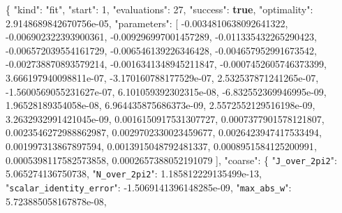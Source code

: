 \documentclass[
  10pt,
]{article}
\newenvironment{Shaded}{}{}
\newcommand{\DataTypeTok}[1]{\textcolor[rgb]{0.56,0.13,0.00}{#1}}
\newcommand{\DecValTok}[1]{\textcolor[rgb]{0.25,0.63,0.44}{#1}}
\newcommand{\FloatTok}[1]{\textcolor[rgb]{0.25,0.63,0.44}{#1}}
\newcommand{\FunctionTok}[1]{\textcolor[rgb]{0.02,0.16,0.49}{#1}}
\newcommand{\KeywordTok}[1]{\textcolor[rgb]{0.00,0.44,0.13}{\textbf{#1}}}
\newcommand{\OtherTok}[1]{\textcolor[rgb]{0.00,0.44,0.13}{#1}}
\newcommand{\StringTok}[1]{\textcolor[rgb]{0.25,0.44,0.63}{#1}}
\begin{document}
\begin{Shaded}
\begin{Highlighting}[]
\FunctionTok{\{}
  \DataTypeTok{"kind"}\FunctionTok{:} \StringTok{"fit"}\FunctionTok{,}
  \DataTypeTok{"start"}\FunctionTok{:} \DecValTok{1}\FunctionTok{,}
  \DataTypeTok{"evaluations"}\FunctionTok{:} \DecValTok{27}\FunctionTok{,}
  \DataTypeTok{"success"}\FunctionTok{:} \KeywordTok{true}\FunctionTok{,}
  \DataTypeTok{"optimality"}\FunctionTok{:} \FloatTok{2.9148689842670756e{-}05}\FunctionTok{,}
  \DataTypeTok{"parameters"}\FunctionTok{:} \OtherTok{[}
    \FloatTok{{-}0.0034810638092641322}\OtherTok{,}
    \FloatTok{{-}0.006902322393900361}\OtherTok{,}
    \FloatTok{{-}0.009296997001457289}\OtherTok{,}
    \FloatTok{{-}0.011335432265290423}\OtherTok{,}
    \FloatTok{{-}0.006572039554161729}\OtherTok{,}
    \FloatTok{{-}0.006546139226346428}\OtherTok{,}
    \FloatTok{{-}0.004657952991673542}\OtherTok{,}
    \FloatTok{{-}0.002738870893579214}\OtherTok{,}
    \FloatTok{{-}0.0016341348945211847}\OtherTok{,}
    \FloatTok{{-}0.0007452605746373399}\OtherTok{,}
    \FloatTok{3.666197940098811e{-}07}\OtherTok{,}
    \FloatTok{{-}3.170160788177529e{-}07}\OtherTok{,}
    \FloatTok{2.532537871241265e{-}07}\OtherTok{,}
    \FloatTok{{-}1.5600569055231627e{-}07}\OtherTok{,}
    \FloatTok{6.101059392302315e{-}08}\OtherTok{,}
    \FloatTok{{-}6.832552369946995e{-}09}\OtherTok{,}
    \FloatTok{1.96528189354058e{-}08}\OtherTok{,}
    \FloatTok{6.964435875686373e{-}09}\OtherTok{,}
    \FloatTok{2.5572552129516198e{-}09}\OtherTok{,}
    \FloatTok{3.2632932991421045e{-}09}\OtherTok{,}
    \FloatTok{0.0016150917531307727}\OtherTok{,}
    \FloatTok{0.0007377901578121807}\OtherTok{,}
    \FloatTok{0.0023546272988862987}\OtherTok{,}
    \FloatTok{0.0029702330023459677}\OtherTok{,}
    \FloatTok{0.0026423947417533494}\OtherTok{,}
    \FloatTok{0.001997313867897594}\OtherTok{,}
    \FloatTok{0.0013915048792481337}\OtherTok{,}
    \FloatTok{0.0008951584125200991}\OtherTok{,}
    \FloatTok{0.0005398117582573858}\OtherTok{,}
    \FloatTok{0.0002657388052191079}
  \OtherTok{]}\FunctionTok{,}
  \DataTypeTok{"coarse"}\FunctionTok{:} \FunctionTok{\{}
    \DataTypeTok{"\nolinkurl{J_over_2pi2}"}\FunctionTok{:} \FloatTok{5.065274136750738}\FunctionTok{,}
    \DataTypeTok{"\nolinkurl{N_over_2pi2}"}\FunctionTok{:} \FloatTok{1.185812229135499e{-}13}\FunctionTok{,}
    \DataTypeTok{"\nolinkurl{scalar_identity_error}"}\FunctionTok{:} \FloatTok{{-}1.5069141396148285e{-}09}\FunctionTok{,}
    \DataTypeTok{"\nolinkurl{max_abs_w}"}\FunctionTok{:} \FloatTok{5.723885058167878e{-}08}\FunctionTok{,}

\end{Highlighting}
\end{Shaded}
\end{document}
